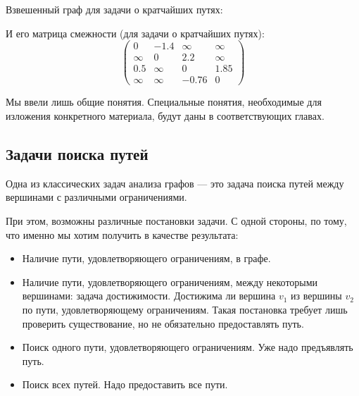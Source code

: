 \begin{example}
  Взвешенный граф для задачи о кратчайших путях:
  \begin{center}
  \end{center}

  И его матрица смежности (для задачи о кратчайших путях):
  $$
  \begin{pmatrix}
    0 & -1.4 & \infty & \infty \\
    \infty & 0 & 2.2 & \infty \\
    0.5 & \infty & 0 & 1.85 \\
    \infty & \infty & -0.76 & 0
  \end{pmatrix}
  $$
\end{example}

Мы ввели лишь общие понятия.
Специальные понятия, необходимые для изложения конкретного материала, будут даны в соответствующих главах.

\subsection{Задачи поиска путей}

Одна из классических задач анализа графов --- это задача поиска путей между вершинами с различными ограничениями.

При этом, возможны различные постановки задачи.
С одной стороны, по тому, что именно мы хотим получить в качестве результата:
\begin{itemize}
\item Наличие пути, удовлетворяющего ограничениям, в графе.
\item Наличие пути, удовлетворяющего ограничениям, между некоторыми вершинами: задача достижимости. 
      Достижима ли вершина $v_1$ из вершины $v_2$ по пути, удовлетворяющему ограничениям.
      Такая постановка требует лишь проверить существование, но не обязательно предоставлять путь.
\item Поиск одного пути, удовлетворяющего ограничениям. Уже надо предъявлять путь.
\item Поиск всех путей. Надо предоставить все пути.
\end{itemize}

